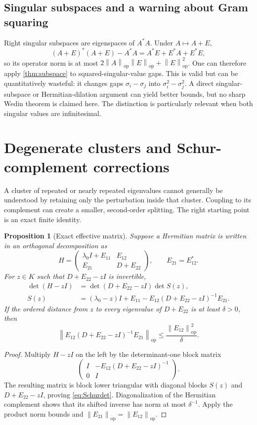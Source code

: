 \documentclass[11pt,a4paper]{article}
\numberwithin{equation}{section}
\newtheorem{proposition}[proposition]{Proposition}
\theoremstyle{definition}
\theoremstyle{remark}
\newcommand{\op}{\mathrm{op}}
\newcommand{\norm}[1]{\left\lVert#1\right\rVert}
\begin{document}
\subsection{Singular subspaces and a warning about Gram squaring}
Right singular subspaces are eigenspaces of $A^*A$. Under $A\mapsto A+E$,
\[
 (A+E)^*(A+E)-A^*A=A^*E+E^*A+E^*E,
\]
so its operator norm is at most
$2\norm A_{\op}\norm E_{\op}+\norm E_{\op}^2$.
One can therefore apply \cref{thm:subspace} to squared-singular-value gaps.
This is valid but can be quantitatively wasteful: it changes gaps
$\sigma_i-\sigma_j$ into $\sigma_i^2-\sigma_j^2$. A direct singular-subspace
or Hermitian-dilation argument can yield better bounds, but no sharp Wedin
theorem is claimed here. The distinction is particularly relevant when
both singular values are infinitesimal.

\section{Degenerate clusters and Schur-complement corrections}\label{sec:schur}

A cluster of repeated or nearly repeated eigenvalues cannot generally be
understood by retaining only the perturbation inside that cluster. Coupling
to its complement can create a smaller, second-order splitting. The right
starting point is an exact finite identity.

\begin{proposition}[Exact effective matrix]\label{prop:effective}
Suppose a Hermitian matrix is written in an orthogonal decomposition as
\[
 H=\begin{pmatrix}
       \lambda_0 I+E_{11}&E_{12}\\
       E_{21}&D+E_{22}
    \end{pmatrix},\qquad E_{21}=E_{12}^*.
\]
For $z\in K$ such that $D+E_{22}-zI$ is invertible,
\begin{align}
 \det(H-zI)&=\det(D+E_{22}-zI)\det S(z),\label{eq:Schurdet}\\
 S(z)&=(\lambda_0-z)I+E_{11}
        -E_{12}(D+E_{22}-zI)^{-1}E_{21}.\label{eq:effective}
\end{align}
If the ordered distance from $z$ to every eigenvalue of $D+E_{22}$ is at
least $\delta>0$, then
\begin{equation}\label{eq:effectivebound}
 \norm{E_{12}(D+E_{22}-zI)^{-1}E_{21}}_{\op}
 \le\frac{\norm{E_{12}}_{\op}^2}{\delta}.
\end{equation}
\end{proposition}
\begin{proof}
Multiply $H-zI$ on the left by the determinant-one block matrix
\[
 \begin{pmatrix}I&-E_{12}(D+E_{22}-zI)^{-1}\\0&I\end{pmatrix}.
\]
The resulting matrix is block lower triangular with diagonal blocks $S(z)$
and $D+E_{22}-zI$, proving \eqref{eq:Schurdet}. Diagonalization of the
Hermitian complement shows that its shifted inverse has norm at most
$\delta^{-1}$. Apply the product norm bounds and
$\norm{E_{21}}_{\op}=\norm{E_{12}}_{\op}$.
\end{proof}
\end{document}
